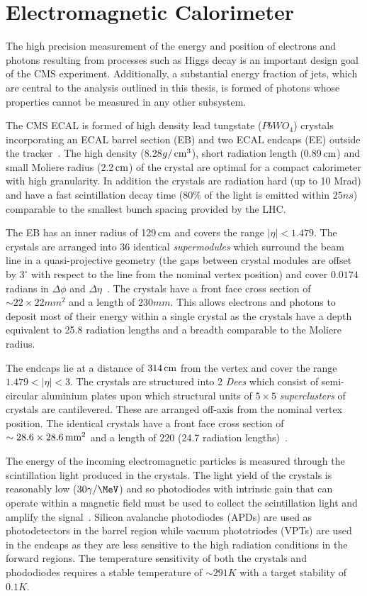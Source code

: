 \section{Electromagnetic Calorimeter}

The high precision measurement of the energy and position of electrons and photons resulting from 
processes such as Higgs decay is an important design goal of the CMS experiment. Additionally,
a substantial energy fraction of jets, which are central to the analysis outlined in this
thesis, is formed of photons whose properties cannot be measured in any other subsystem.

The CMS ECAL is formed of high density lead tungstate ($PbWO_4$) crystals incorporating an ECAL barrel section (EB) 
and two ECAL endcaps (EE) outside the tracker~\cite{ecal_tdr}. The high density (8.28$g/\,\text{cm}^3$), short radiation length (0.89$\,\text{cm}$) 
and small Moliere radius (2.2$\,\text{cm}$) of the crystal are optimal for a compact calorimeter with high granularity. In addition the 
crystals are radiation hard (up to 10 Mrad) and have a fast scintillation decay time (80\% of the light is emitted within $25ns$)
comparable to the smallest bunch spacing provided by the LHC. 

The EB has an inner radius of 129$\,\text{cm}$ and covers the range $|\eta| < 1.479$. The crystals are arranged into 36 
identical \emph{supermodules} which surround the beam line in a quasi-projective geometry (the gaps between
crystal modules are offset by $3^\circ$ with respect to the line from the nominal vertex position)
and cover $0.0174$ radians in $\Delta\phi$ and $\Delta\eta$~\cite{CMS}. The crystals have a front face cross section 
of $\sim 22\times22mm^2$ and a length of $230mm$. This allows electrons and photons to deposit most of their  
energy within a single crystal as the crystals have a depth equivalent to 25.8 radiation lengths and 
a breadth comparable to the Moliere radius. 

The endcaps lie at a distance of $314 \,\text{cm}$ from the vertex and cover the range $1.479<|\eta|<3$. The crystals
are structured into 2 \emph{Dees} which consist of semi-circular aluminium plates upon which structural units of 
$5\times5$ \emph{superclusters} of crystals are cantilevered. These are arranged off-axis from
the nominal vertex position. The identical crystals have a front face cross section of 
$\sim 28.6\times28.6 \,\text{mm}^2$ and a length of $220$ \mm (24.7 radiation lengths)~\cite{CMS}.

The energy of the incoming electromagnetic particles is measured through the scintillation light produced
in the crystals. The light yield of the crystals is reasonably low ($30\gamma/\MeV$)
and so photodiodes with intrinsic gain that can operate within a magnetic field must be used to collect 
the scintillation light and amplify the signal~\cite{ecal_tdr}. Silicon avalanche photodiodes (APDs) are used as 
photodetectors in the barrel region while vacuum phototriodes (VPTs) are used in the endcaps as they are less sensitive
to the high radiation conditions in the forward regions. The temperature sensitivity of both the crystals 
and phododiodes requires a stable temperature of $\sim291K$ with a target stability of $0.1K$. 

